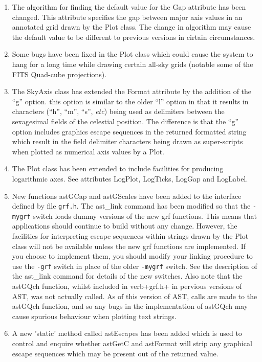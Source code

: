 \documentclass[twoside,11pt]{article}
\begin{document}
\begin{enumerate}
\item The algorithm for finding the default value for the Gap attribute
has been changed. This attribute specifies the gap between major axis
values in an annotated grid drawn by the Plot class. The change in
algorithm may cause the default value to be different to previous versions 
in cirtain circumstances.

\item Some bugs have been fixed in the Plot class which could cause the
system to hang for a long time while drawing certain all-sky grids
(notable some of the FITS Quad-cube projections).

\item The SkyAxis class has extended the Format attribute by the addition
of the ``g'' option. this option is similar to the older ``l'' option in that 
it results in characters (``h'', ``m'', ``s'', \emph{etc}) being used as 
delimiters between the sexagesimal fields of the celestial position. The
difference is that the ``g'' option includes graphics escape sequences
in the returned formatted string which result in the field delimiter 
characters being drawn as super-scripts when plotted as numerical axis values 
by a Plot.

\item The Plot class has been extended to include facilities for producing
logarithmic axes. See attributes LogPlot, LogTicks, LogGap and LogLabel.

\item New functions astGCap and astGScales have been added to the interface
defined by file \verb+grf.h+. The ast\_link command has been modified so
that the \verb+-mygrf+ switch loads dummy versions of the new grf
functions. This means that applications should continue to build without
any change. However, the facilities for interpreting escape sequences
within strings drawn by the Plot class will not be available unless the
new grf functions are implemented. If you choose to implement them, you
should modify your linking procedure to use the \verb+-grf+ switch in
place of the older \verb+-mygrf+ switch. See the description of the ast\_link 
command for details of the new switches. Also note that the astGQch
function, whilst included in verb+grf.h+ in pervious versions of AST, was
not actually called. As of this version of AST, calls are made to the 
astGQch function, and so any bugs in the implementation of astGQch may
cause spurious behaviour when plotting text strings.

\item A new 'static' method called astEscapes has been added which is used 
to control and enquire whether astGetC and astFormat will strip any graphical 
escape sequences which may be present out of the returned value.


\end{enumerate}
\end{document}
